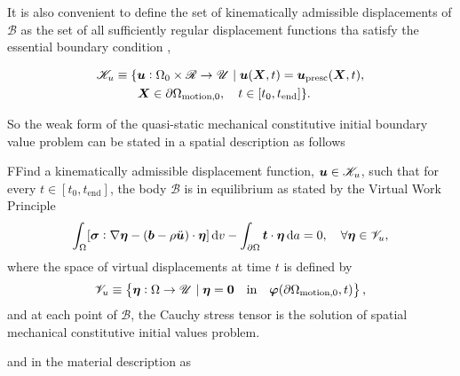 It is also convenient to define the set of kinematically admissible displacements of $\mathscr{B}$ as the set of all sufficiently regular displacement functions tha satisfy the essential boundary condition \citep{de2011computational},
\begin{highlight}[innertopmargin=-5pt]
    \begin{multline}
        \mathscr{K}_u\equiv \{\bm{u}:\Omega_0\times \mathscr{R}\to \mathscr{U}\;|\;\bm{u}(\bm{X},t) = \bm{u}_\text{presc} (\bm{X},t),\\ \bm{X}\in\partial \Omega_\text{motion,0},\quad t\in [t_0,t_\text{end}]\}.\quad
    \end{multline}
\end{highlight}

So the weak form of the quasi-static mechanical constitutive initial boundary value problem can be stated in a spatial description as follows
\begin{problem}
    FFind a kinematically admissible displacement function, $\bm{u}\in \mathscr{K}_u$, such that for every $t\in [t_0,t_\text{end}]$, the body $\mathscr{B}$ is in equilibrium as stated by the Virtual Work Principle
        \begin{equation}
        \int_\Omega [\bm{\sigma}:\nabla \bm{\eta} - (\bm{b}-\rho\ddot{\bm u})\cdot \bm{\eta}]\,\mathrm{d} v - \int_{\partial\Omega} \bm{t}\cdot \bm{\eta}\,\mathrm{d} a = 0,\quad \forall \bm{\eta} \in \mathscr{V}_u,
    \end{equation}
    where the space of virtual displacements at time $t$ is defined by
    \begin{equation}
        \mathscr{V}_u \equiv \left\{\bm{\eta}:\Omega\to \mathscr{U}\;|\;\bm{\eta} = \bm{0}\quad \text{in}\quad \bm \varphi(\partial\Omega_\text{motion,0},t)\right\},
    \end{equation}
    and at each point of $\mathscr{B}$, the Cauchy stress tensor is the solution of spatial mechanical constitutive initial values problem.
\end{problem}
and in the material description as
